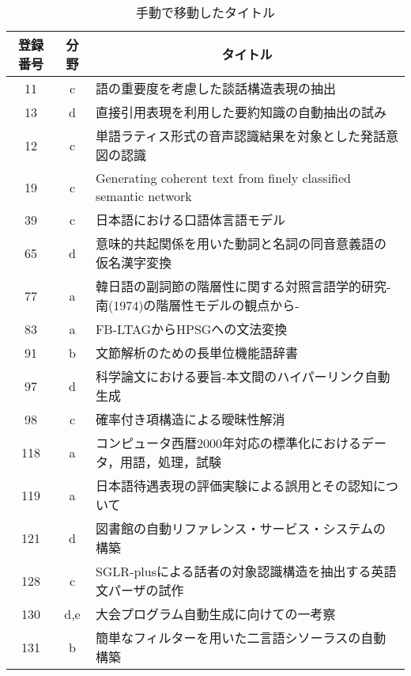 \begin{table*}
\begin{center}
\caption[表]{\label{idou}手動で移動したタイトル}
\scriptsize
\begin{tabular}{|c|c|l|}\hline 
登録番号& 分野 & \multicolumn{1}{|c|}{タイトル}\\\hline
 11 & c & 語の重要度を考慮した談話構造表現の抽出\\\hline
 13 & d & 直接引用表現を利用した要約知識の自動抽出の試み\\\hline
 12 & c & 単語ラティス形式の音声認識結果を対象とした発話意図の認識\\\hline
 19 & c & Generating coherent text from finely classified semantic network\\\hline
 39 & c & 日本語における口語体言語モデル\\\hline
 65 & d & 意味的共起関係を用いた動詞と名詞の同音意義語の仮名漢字変換\\\hline
 77 & a & 韓日語の副詞節の階層性に関する対照言語学的研究-南(1974)の階層性モデルの観点から-\\\hline
 83 & a & FB-LTAGからHPSGへの文法変換 \\\hline
 91 & b & 文節解析のための長単位機能語辞書\\\hline
 97 & d & 科学論文における要旨-本文間のハイパーリンク自動生成\\\hline
 98 & c & 確率付き項構造による曖昧性解消\\\hline
118 & a & コンピュータ西暦2000年対応の標準化におけるデータ，用語，処理，試験\\\hline
119 & a & 日本語待遇表現の評価実験による誤用とその認知について\\\hline
121 & d & 図書館の自動リファレンス・サービス・システムの構築\\\hline
128 & c & SGLR-plusによる話者の対象認識構造を抽出する英語文パーザの試作\\\hline
130 & d,e & 大会プログラム自動生成に向けての一考察\\\hline 
131 & b & 簡単なフィルターを用いた二言語シソーラスの自動構築\\\hline
\end{tabular}
\end{center}
\end{table*}

